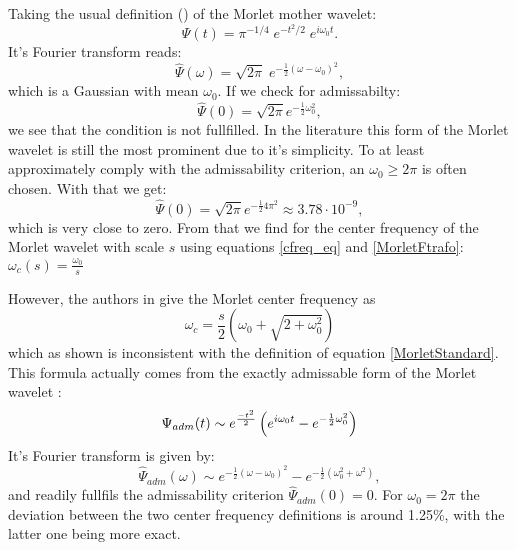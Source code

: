 Taking the usual definition (\cite{Torrence1998}) of the Morlet mother wavelet:
\begin{equation}
  \label{MorletStandard}
  \Psi(t) = \pi^{-1/4} \; e^{-t^2/2} \; e^{i\omega_0 t}.
\end{equation}
It's Fourier transform reads:
\begin{equation}
  \label{MorletFtrafo}
  \widehat{\Psi}(\omega) =  \sqrt{2\pi}\;e^{-\frac{1}{2}(\omega - \omega_0)^2},
\end{equation}
which is a Gaussian with mean $\omega_0$. If we check for admissabilty:
\begin{equation}
  \widehat{\Psi}(0) = \sqrt{2\pi}e^{-\frac{1}{2} \omega_0^2},
\end{equation}
we see that the condition is not fullfilled. In the literature this form of the Morlet wavelet is still the most prominent due to it's simplicity. To at least approximately comply with the admissability criterion, an $\omega_0 \geq 2\pi$ is often chosen. With that we get:
\begin{equation}
  \widehat{\Psi}(0) = \sqrt{2\pi}e^{-\frac{1}{2} 4\pi^2} \approx 3.78\cdot 10^{-9},
\end{equation}
which is very close to zero. From that we find for the center frequency of the Morlet wavelet with scale $s$ using equations \ref{cfreq_eq} and \ref{MorletFtrafo}: $\omega_c(s) = \frac{\omega_0}{s}$

However, the authors in \cite{Torrence1998} give the Morlet center frequency as
\begin{equation}\label{cfreq_TC}
  \omega_c = \frac{s}{2}(\omega_0 + \sqrt{2 + \omega_0^2})
\end{equation}
which as shown is inconsistent with the definition of equation \ref{MorletStandard}.  This formula actually comes from the exactly admissable form of the Morlet wavelet \cite{Ashmead2010}:
\begin{equation}
  \Psi_{adm}(t) \sim e^{\frac{-t^2}{2}} \left (e^{i \omega_0 t} - e^{-\frac{1}{2}\omega_0^2} \right)
\end{equation}
It's Fourier transform is given by:
\begin{equation}
  \widehat{\Psi}_{adm}(\omega) \sim e^{-\frac{1}{2}(\omega - \omega_0)^2}
  - e^{-\frac{1}{2}(\omega_0^2 + \omega^2)},
\end{equation}
and readily fullfils the admissability criterion $\widehat{\Psi}_{adm}(0) = 0$. For $\omega_0 = 2\pi$ the deviation between the two center frequency definitions is around 1.25\%, with the latter one being more exact.






